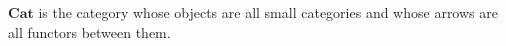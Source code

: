 $\mathbf{Cat}$ is the category whose objects are all small categories and whose arrows are all functors between them.
